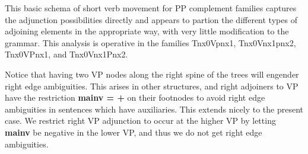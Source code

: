 This basic schema of short verb movement for PP complement families
captures the adjunction possibilities directly and appears to partion
the different types of adjoining elements in the appropriate way, with
very little modification to the grammar.  This analysis is operative
in the families Tnx0Vpnx1, Tnx0Vnx1pnx2, Tnx0VPnx1, and Tnx0Vnx1Pnx2.

Notice that having two VP nodes along the right spine of the trees
will engender right edge ambiguities.  This arises in other
structures, and right adjoiners to VP have the restriction {\bf mainv
= +} on their footnodes to avoid right edge ambiguities in sentences
which have auxiliaries.  This extends nicely to the present case.  We
restrict right VP adjunction to occur at the higher VP by letting {\bf
mainv} be negative in the lower VP, and thus we do not get right edge
ambiguities.
